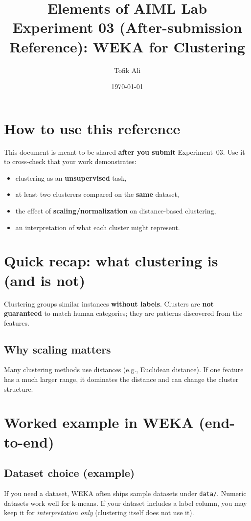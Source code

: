 \documentclass[11pt]{article}
\title{Elements of AIML Lab\\Experiment 03 (After-submission Reference): WEKA for Clustering}
\author{Tofik Ali}
\date{\today}
\begin{document}
\maketitle
\tableofcontents

\section{How to use this reference}
This document is meant to be shared \textbf{after you submit} Experiment~03.
Use it to cross-check that your work demonstrates:
\begin{itemize}[leftmargin=*]
  \item clustering as an \textbf{unsupervised} task,
  \item at least two clusterers compared on the \textbf{same} dataset,
  \item the effect of \textbf{scaling/normalization} on distance-based clustering,
  \item an interpretation of what each cluster might represent.
\end{itemize}

\section{Quick recap: what clustering is (and is not)}
Clustering groups similar instances \textbf{without labels}.
Clusters are \textbf{not guaranteed} to match human categories; they are patterns discovered from the features.

\subsection{Why scaling matters}
Many clustering methods use distances (e.g., Euclidean distance).
If one feature has a much larger range, it dominates the distance and can change the cluster structure.

\section{Worked example in WEKA (end-to-end)}
\subsection{Dataset choice (example)}
If you need a dataset, WEKA often ships sample datasets under \texttt{data/}.
Numeric datasets work well for k-means.
If your dataset includes a label column, you may keep it for \emph{interpretation only} (clustering itself does not use it).
\end{document}
